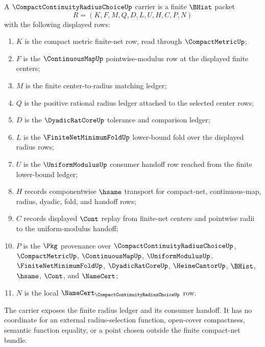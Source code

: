 \begin{definition}
\label{def:compact-continuity-radius-choice-carrier}
A $\CompactContinuityRadiusChoiceUp$ carrier is a finite $\BHist$ packet
$$
R=(K,F,M,Q,D,L,U,H,C,P,N)
$$
with the following displayed rows:
\begin{enumerate}
\item $K$ is the compact metric finite-net row, read through $\CompactMetricUp$;
\item $F$ is the $\ContinuousMapUp$ pointwise-modulus row at the displayed finite centers;
\item $M$ is the finite center-to-radius matching ledger;
\item $Q$ is the positive rational radius ledger attached to the selected center rows;
\item $D$ is the $\DyadicRatCoreUp$ tolerance and comparison ledger;
\item $L$ is the $\FiniteNetMinimumFoldUp$ lower-bound fold over the displayed radius rows;
\item $U$ is the $\UniformModulusUp$ consumer handoff row reached from the finite lower-bound ledger;
\item $H$ records componentwise $\hsame$ transport for compact-net, continuous-map, radius, dyadic, fold, and handoff rows;
\item $C$ records displayed $\Cont$ replay from finite-net centers and pointwise radii to the uniform-modulus handoff;
\item $P$ is the $\Pkg$ provenance over $\CompactContinuityRadiusChoiceUp$, $\CompactMetricUp$, $\ContinuousMapUp$, $\UniformModulusUp$, $\FiniteNetMinimumFoldUp$, $\DyadicRatCoreUp$, $\HeineCantorUp$, $\BHist$, $\hsame$, $\Cont$, and $\NameCert$;
\item $N$ is the local $\NameCert_{\CompactContinuityRadiusChoiceUp}$ row.
\end{enumerate}
The carrier exposes the finite radius ledger and its consumer handoff. It has no coordinate for an external radius-selection function, open-cover compactness, semantic function equality, or a point chosen outside the finite compact-net bundle.
\end{definition}

